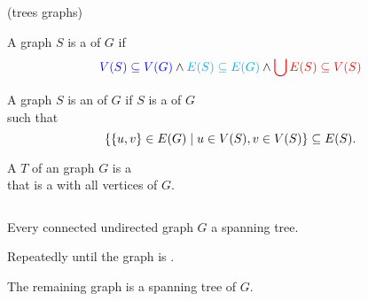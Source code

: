 
\begin{frame}{}

  \begin{center}
     (trees  graphs)
  \end{center}
\end{frame}

\begin{frame}{}
  \begin{definition}[Subgraph (子图)]
    A graph $S$ is a  of $G$ if
    \[
      \textcolor{blue}{V(S) \subseteq V(G)} \land \textcolor{cyan}{E(S) \subseteq E(G)}
      \land \textcolor{red}{\bigcup E(S) \subseteq V(S)}
    \]
  \end{definition}

  \pause

  \pause
  \vspace{-0.30cm}
  \begin{definition}
    A graph $S$ is an  of $G$ if
    $S$ is a  of $G$ \\ such that
    \[
      \{\{u, v\} \in E(G) \mid u \in V(S), v \in V(S)\} \subseteq E(S).
    \]
  \end{definition}
\end{frame}

\begin{frame}{}
  \begin{definition}
    A  $T$ of an  graph $G$ is a  \\
    that is a  with all vertices of $G$.
  \end{definition}

  \pause
  \vspace{0.50cm}
  \begin{columns}
      \pause
  \end{columns}
\end{frame}

\begin{frame}{}
  \begin{theorem}
    Every connected undirected graph $G$  a spanning tree.
  \end{theorem}

  \pause
  \vspace{0.50cm}
  \begin{center}
    Repeatedly  until the graph is .

    \pause
    \vspace{0.30cm}
    The remaining graph is a spanning tree of $G$.
  \end{center}
\end{frame}

